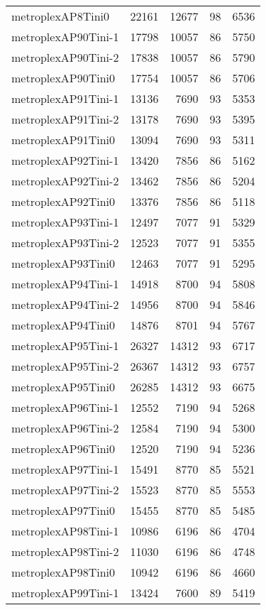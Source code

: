 \begin{longtable}{lrrrr}
metroplexAP8Tini0 & 22161 & 12677 & 98 & 6536 \\
metroplexAP90Tini-1 & 17798 & 10057 & 86 & 5750 \\
metroplexAP90Tini-2 & 17838 & 10057 & 86 & 5790 \\
metroplexAP90Tini0 & 17754 & 10057 & 86 & 5706 \\
metroplexAP91Tini-1 & 13136 & 7690 & 93 & 5353 \\
metroplexAP91Tini-2 & 13178 & 7690 & 93 & 5395 \\
metroplexAP91Tini0 & 13094 & 7690 & 93 & 5311 \\
metroplexAP92Tini-1 & 13420 & 7856 & 86 & 5162 \\
metroplexAP92Tini-2 & 13462 & 7856 & 86 & 5204 \\
metroplexAP92Tini0 & 13376 & 7856 & 86 & 5118 \\
metroplexAP93Tini-1 & 12497 & 7077 & 91 & 5329 \\
metroplexAP93Tini-2 & 12523 & 7077 & 91 & 5355 \\
metroplexAP93Tini0 & 12463 & 7077 & 91 & 5295 \\
metroplexAP94Tini-1 & 14918 & 8700 & 94 & 5808 \\
metroplexAP94Tini-2 & 14956 & 8700 & 94 & 5846 \\
metroplexAP94Tini0 & 14876 & 8701 & 94 & 5767 \\
metroplexAP95Tini-1 & 26327 & 14312 & 93 & 6717 \\
metroplexAP95Tini-2 & 26367 & 14312 & 93 & 6757 \\
metroplexAP95Tini0 & 26285 & 14312 & 93 & 6675 \\
metroplexAP96Tini-1 & 12552 & 7190 & 94 & 5268 \\
metroplexAP96Tini-2 & 12584 & 7190 & 94 & 5300 \\
metroplexAP96Tini0 & 12520 & 7190 & 94 & 5236 \\
metroplexAP97Tini-1 & 15491 & 8770 & 85 & 5521 \\
metroplexAP97Tini-2 & 15523 & 8770 & 85 & 5553 \\
metroplexAP97Tini0 & 15455 & 8770 & 85 & 5485 \\
metroplexAP98Tini-1 & 10986 & 6196 & 86 & 4704 \\
metroplexAP98Tini-2 & 11030 & 6196 & 86 & 4748 \\
metroplexAP98Tini0 & 10942 & 6196 & 86 & 4660 \\
metroplexAP99Tini-1 & 13424 & 7600 & 89 & 5419 \\

\end{longtable}
